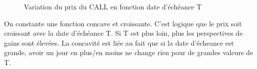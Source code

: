 \begin{figure}[H]
\centering

\caption{Variation du prix du CALL en fonction date d'échéance T}
\label{fig:call_t}
\end{figure}

On constante une fonction concave et croissante. C'est logique que le prix soit croissant avec la date d'échéance T. Si T est plus loin, plus les perspectives de gains sont élevées. La concavité est liée au fait que si la date d'écheance est grande, avoir un jour en plus/en moins ne change rien pour de grandes valeurs de T. 
